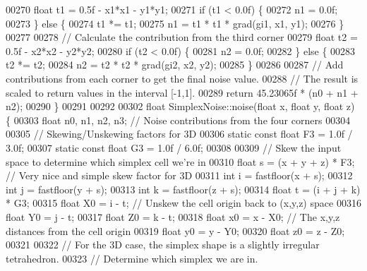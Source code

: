 \begin{DoxyCode}
00270     \textcolor{keywordtype}{float} t1 = 0.5f - x1*x1 - y1*y1;
00271     \textcolor{keywordflow}{if} (t1 < 0.0f) \{
00272         n1 = 0.0f;
00273     \} \textcolor{keywordflow}{else} \{
00274         t1 *= t1;
00275         n1 = t1 * t1 * grad(gi1, x1, y1);
00276     \}
00277 
00278     \textcolor{comment}{// Calculate the contribution from the third corner}
00279     \textcolor{keywordtype}{float} t2 = 0.5f - x2*x2 - y2*y2;
00280     \textcolor{keywordflow}{if} (t2 < 0.0f) \{
00281         n2 = 0.0f;
00282     \} \textcolor{keywordflow}{else} \{
00283         t2 *= t2;
00284         n2 = t2 * t2 * grad(gi2, x2, y2);
00285     \}
00286 
00287     \textcolor{comment}{// Add contributions from each corner to get the final noise value.}
00288     \textcolor{comment}{// The result is scaled to return values in the interval [-1,1].}
00289     \textcolor{keywordflow}{return} 45.23065f * (n0 + n1 + n2);
00290 \}
00291 
00292 
00302 \textcolor{keywordtype}{float} SimplexNoise::noise(\textcolor{keywordtype}{float} x, \textcolor{keywordtype}{float} y, \textcolor{keywordtype}{float} z) \{
00303     \textcolor{keywordtype}{float} n0, n1, n2, n3; \textcolor{comment}{// Noise contributions from the four corners}
00304 
00305     \textcolor{comment}{// Skewing/Unskewing factors for 3D}
00306     \textcolor{keyword}{static} \textcolor{keyword}{const} \textcolor{keywordtype}{float} F3 = 1.0f / 3.0f;
00307     \textcolor{keyword}{static} \textcolor{keyword}{const} \textcolor{keywordtype}{float} G3 = 1.0f / 6.0f;
00308 
00309     \textcolor{comment}{// Skew the input space to determine which simplex cell we're in}
00310     \textcolor{keywordtype}{float} s = (x + y + z) * F3; \textcolor{comment}{// Very nice and simple skew factor for 3D}
00311     \textcolor{keywordtype}{int} i = fastfloor(x + s);
00312     \textcolor{keywordtype}{int} j = fastfloor(y + s);
00313     \textcolor{keywordtype}{int} k = fastfloor(z + s);
00314     \textcolor{keywordtype}{float} t = (i + j + k) * G3;
00315     \textcolor{keywordtype}{float} X0 = i - t; \textcolor{comment}{// Unskew the cell origin back to (x,y,z) space}
00316     \textcolor{keywordtype}{float} Y0 = j - t;
00317     \textcolor{keywordtype}{float} Z0 = k - t;
00318     \textcolor{keywordtype}{float} x0 = x - X0; \textcolor{comment}{// The x,y,z distances from the cell origin}
00319     \textcolor{keywordtype}{float} y0 = y - Y0;
00320     \textcolor{keywordtype}{float} z0 = z - Z0;
00321 
00322     \textcolor{comment}{// For the 3D case, the simplex shape is a slightly irregular tetrahedron.}
00323     \textcolor{comment}{// Determine which simplex we are in.}

\end{DoxyCode}
